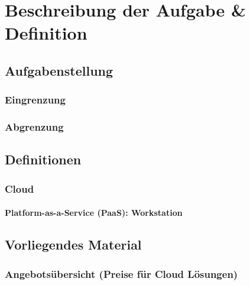\chapter{Beschreibung der Aufgabe \& Definition}

\section{Aufgabenstellung}


\subsection{Eingrenzung}

\subsection{Abgrenzung}



\section{Definitionen}

\subsection{Cloud}

\subsubsection{Platform-as-a-Service (PaaS): Workstation}

\section{Vorliegendes Material}

\subsection{Angebotsübersicht (Preise für Cloud Lösungen)}
